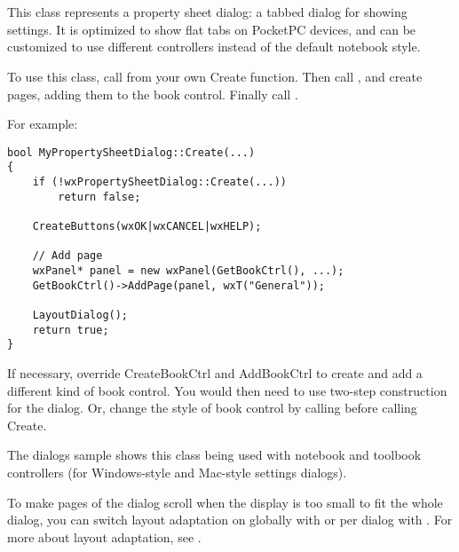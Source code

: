 \section{}\label{wxpropertysheetdialog}

This class represents a property sheet dialog: a tabbed dialog
for showing settings. It is optimized to show flat tabs
on PocketPC devices, and can be customized to use different
controllers instead of the default notebook style.

To use this class, call  from your own
Create function. Then call , and create pages, adding them to the book control.
Finally call .

For example:

\begin{verbatim}
bool MyPropertySheetDialog::Create(...)
{
    if (!wxPropertySheetDialog::Create(...))
        return false;

    CreateButtons(wxOK|wxCANCEL|wxHELP);

    // Add page
    wxPanel* panel = new wxPanel(GetBookCtrl(), ...);
    GetBookCtrl()->AddPage(panel, wxT("General"));

    LayoutDialog();
    return true;
}
\end{verbatim}

If necessary, override CreateBookCtrl and AddBookCtrl to create and add a different
kind of book control. You would then need to use two-step construction for the dialog.
Or, change the style of book control by calling  
before calling Create.

The dialogs sample shows this class being used with notebook and toolbook controllers (for
Windows-style and Mac-style settings dialogs).

To make pages of the dialog scroll when the display is too small to fit the whole dialog, you can switch
layout adaptation on globally with  or
per dialog with . For more
about layout adaptation, see .


\\
\\
\\
\\

